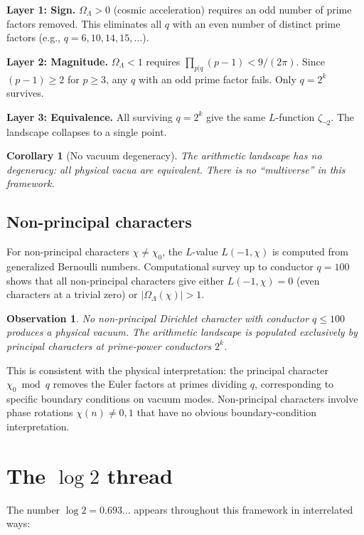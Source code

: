 \documentclass[11pt,a4paper]{article}
\newtheorem{corollary}{Corollary}
\newtheorem{observation}{Observation}
\begin{document}
\textbf{Layer 1: Sign.} $\Omega_\Lambda > 0$ (cosmic acceleration)
requires an odd number of prime factors removed. This eliminates
all $q$ with an even number of distinct prime factors (e.g., $q = 6,
10, 14, 15, \ldots$).

\textbf{Layer 2: Magnitude.} $\Omega_\Lambda < 1$ requires
$\prod_{p|q}(p-1) < 9/(2\pi)$. Since $(p-1) \geq 2$ for $p \geq 3$,
any $q$ with an odd prime factor fails. Only $q = 2^k$ survives.

\textbf{Layer 3: Equivalence.} All surviving $q = 2^k$ give the
same $L$-function $\zeta_{\neg 2}$. The landscape collapses to a
single point.

\begin{corollary}[No vacuum degeneracy]
The arithmetic landscape has no degeneracy: all physical vacua are
equivalent. There is no ``multiverse'' in this framework.
\end{corollary}

\subsection{Non-principal characters}

For non-principal characters $\chi \neq \chi_0$, the $L$-value
$L(-1, \chi)$ is computed from generalized Bernoulli numbers.
Computational survey up to conductor $q = 100$ shows that all
non-principal characters give either $L(-1, \chi) = 0$ (even
characters at a trivial zero) or $|\Omega_\Lambda(\chi)| > 1$.

\begin{observation}
No non-principal Dirichlet character with conductor $q \leq 100$
produces a physical vacuum. The arithmetic landscape is populated
exclusively by principal characters at prime-power conductors $2^k$.
\end{observation}

This is consistent with the physical interpretation: the principal
character $\chi_0 \bmod q$ removes the Euler factors at primes
dividing $q$, corresponding to specific boundary conditions on
vacuum modes. Non-principal characters involve phase rotations
$\chi(n) \neq 0, 1$ that have no obvious boundary-condition
interpretation.

\section{The $\log 2$ thread}

The number $\log 2 = 0.693\ldots$ appears throughout this
framework in interrelated ways:
\end{document}
